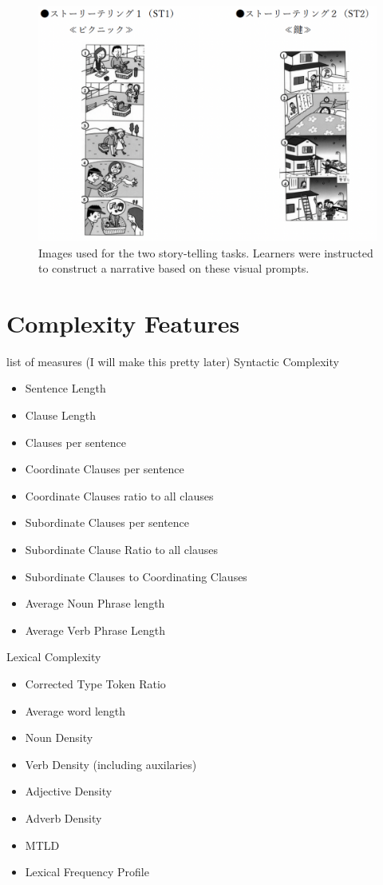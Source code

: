 \begin{figure}[h!]
    \centering
    \includegraphics[scale=.45]{img/ST.png}
    \caption[Story Telling Tasks]{Images used for the two story-telling tasks. Learners were instructed to construct a narrative based on these visual prompts. }
    \label{fig:ST}
\end{figure}


\section{Complexity Features}
list of measures (I will make this pretty later)
Syntactic Complexity
\begin{itemize}
    \item Sentence Length
    \item Clause Length
    \item Clauses per sentence
    \item Coordinate Clauses per sentence
    \item Coordinate Clauses ratio to all clauses
    \item Subordinate Clauses per sentence
    \item Subordinate Clause Ratio to all clauses
    \item Subordinate Clauses to Coordinating Clauses
    \item Average Noun Phrase length
    \item Average Verb Phrase Length
\end{itemize}

Lexical Complexity
\begin{itemize}
    \item Corrected Type Token Ratio
    \item Average word length
    \item Noun Density
    \item Verb Density (including auxilaries)
    \item Adjective Density
    \item Adverb Density
    \item MTLD
    \item Lexical Frequency Profile
\end{itemize}

